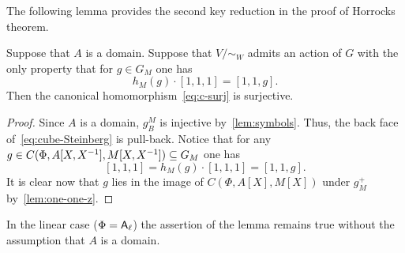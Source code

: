 The following lemma provides the second key reduction in the proof of Horrocks theorem.
\begin{lemma}
    Suppose that $A$ is a domain.
    Suppose that $V/\sim_W$ admits an action of $G$ with the only property that
      for $g \in G_M$ one has \[ h_M(g) \cdot [1, 1, 1] = [1, 1, g]. \]
    Then the canonical homomorphism~\eqref{eq:c-surj} is surjective.
\end{lemma}
\begin{proof}
  Since $A$ is a domain, $g^M_B$ is injective by~\cref{lem:symbols}.
    Thus, the back face of~\eqref{eq:cube-Steinberg} is pull-back.
  Notice that for any $g \in C(\Phi, A[X, X^{-1}], M[X, X^{-1}]) \subseteq G_M$ one has
    \[ [1, 1, 1] = h_M(g) \cdot [1, 1, 1] = [1, 1, g].\]
  It is clear now that $g$ lies in the image of $C(\Phi, A[X], M[X])$ under $g^+_M$ by~\cref{lem:one-one-z}.
\end{proof}

\begin{rem}
    In the linear case ($\Phi = \mathsf{A}_\ell$) the assertion of the lemma remains true without the assumption that $A$ is a domain.
\end{rem}

\begin{comment}
\subsection{Overview of Main structure theorem}

Let $A$ be a local ring with maximal ideal $M$ and residue field $k$.
Recall from~\cite[\S~4]{Su77} or~\cite[\S~VI.6]{Lam10} that for $r \geq 3$ the elementary linear group $\E_r(A[X, X\inv])$ admits the following decomposition:
\begin{equation}\label{eq:triple-decomposition}
\E_r(A[X^{\pm 1}]) = \E_r(A[X]) \cdot B(A[X^{\pm 1}]) \cdot \E_r(A[X^{\pm 1}], M[X^{\pm 1}]).
\end{equation}
Here $\E_r(-)$ denotes the same object as $\Esc(\rA_{r - 1}, -)$ before.
Recall that the relative elementary subgroup $\E_r(R, I)$ is defined as the kernel of canonical reduction homomorphism $\E_r(R) \to \E_r(R/I).$
Recall also that $B(R)$ denotes the Borel subgroup (i.\,e. the semidirect product of the unipotent radical $\UU(\Phi^+, R)$ and the group of diagonal matrices).

Decomposition~\eqref{eq:triple-decomposition} is a key tool in the study of the {$\K_1$-analogue of Serre's problem}.
We want to devise some analogue of it which would be suitable for study of Steinberg groups.
\end{comment}

